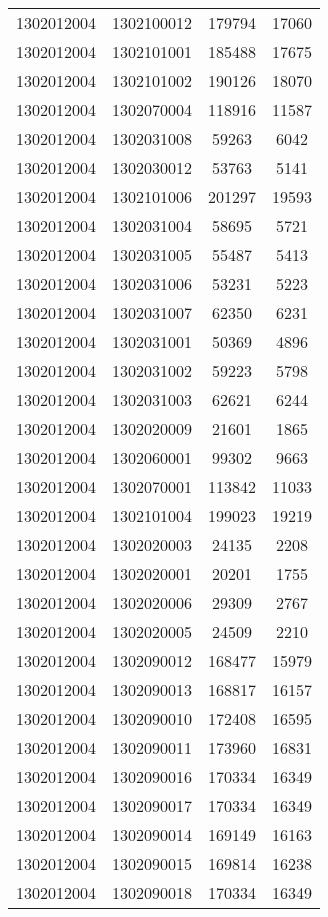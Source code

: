 \begin{longtable}[h]{llcc}
		1302012004 & 1302100012 & 179794 & 17060\\
		1302012004 & 1302101001 & 185488 & 17675\\
		1302012004 & 1302101002 & 190126 & 18070\\
		1302012004 & 1302070004 & 118916 & 11587\\
		1302012004 & 1302031008 & 59263 & 6042\\
		1302012004 & 1302030012 & 53763 & 5141\\
		1302012004 & 1302101006 & 201297 & 19593\\
		1302012004 & 1302031004 & 58695 & 5721\\
		1302012004 & 1302031005 & 55487 & 5413\\
		1302012004 & 1302031006 & 53231 & 5223\\
		1302012004 & 1302031007 & 62350 & 6231\\
		1302012004 & 1302031001 & 50369 & 4896\\
		1302012004 & 1302031002 & 59223 & 5798\\
		1302012004 & 1302031003 & 62621 & 6244\\
		1302012004 & 1302020009 & 21601 & 1865\\
		1302012004 & 1302060001 & 99302 & 9663\\
		1302012004 & 1302070001 & 113842 & 11033\\
		1302012004 & 1302101004 & 199023 & 19219\\
		1302012004 & 1302020003 & 24135 & 2208\\
		1302012004 & 1302020001 & 20201 & 1755\\
		1302012004 & 1302020006 & 29309 & 2767\\
		1302012004 & 1302020005 & 24509 & 2210\\
		1302012004 & 1302090012 & 168477 & 15979\\
		1302012004 & 1302090013 & 168817 & 16157\\
		1302012004 & 1302090010 & 172408 & 16595\\
		1302012004 & 1302090011 & 173960 & 16831\\
		1302012004 & 1302090016 & 170334 & 16349\\
		1302012004 & 1302090017 & 170334 & 16349\\
		1302012004 & 1302090014 & 169149 & 16163\\
		1302012004 & 1302090015 & 169814 & 16238\\
		1302012004 & 1302090018 & 170334 & 16349\\

\end{longtable}
